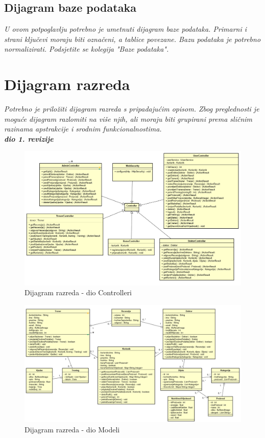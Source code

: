 			\subsection{Dijagram baze podataka}
				\textit{ U ovom potpoglavlju potrebno je umetnuti dijagram baze podataka. Primarni i strani ključevi moraju biti označeni, a tablice povezane. Bazu podataka je potrebno normalizirati. Podsjetite se kolegija "Baze podataka".}
			
			\eject
			
			
		\section{Dijagram razreda}
		
			\textit{Potrebno je priložiti dijagram razreda s pripadajućim opisom. Zbog preglednosti je moguće dijagram razlomiti na više njih, ali moraju biti grupirani prema sličnim razinama apstrakcije i srodnim funkcionalnostima.}\\
			
			\textbf{\textit{dio 1. revizije}}\\
			
			\begin{figure}[H]
			\includegraphics[scale=0.65]{slike/Controlleri.PNG}
			\centering
			\caption{Dijagram razreda - dio Controlleri}
			\label{fig:promjene}
			\end{figure}

			\begin{figure}[H]
			\includegraphics[scale=0.6]{slike/Modeli.PNG}
			\centering
			\caption{Dijagram razreda - dio Modeli}
			\label{fig:promjene}
			\end{figure}
			
